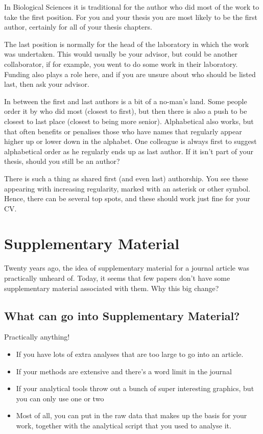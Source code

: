 \documentclass[
]{krantz}
\providecommand{\tightlist}{%
  \setlength{\itemsep}{0pt}\setlength{\parskip}{0pt}}
\begin{document}
In Biological Sciences it is traditional for the author who did most of the work to take the first position. For you and your thesis you are most likely to be the first author, certainly for all of your thesis chapters.

The last position is normally for the head of the laboratory in which the work was undertaken. This would usually be your advisor, but could be another collaborator, if for example, you went to do some work in their laboratory. Funding also plays a role here, and if you are unsure about who should be listed last, then ask your advisor.

In between the first and last authors is a bit of a no-man's land. Some people order it by who did most (closest to first), but then there is also a push to be closest to last place (closest to being more senior). Alphabetical also works, but that often benefits or penalises those who have names that regularly appear higher up or lower down in the alphabet. One colleague is always first to suggest alphabetical order as he regularly ends up as last author. If it isn't part of your thesis, should you still be an author?

There is such a thing as shared first (and even last) authorship. You see these appearing with increasing regularity, marked with an asterisk or other symbol. Hence, there can be several top spots, and these should work just fine for your CV.

\hypertarget{suppinfo}{%
\section{Supplementary Material}\label{suppinfo}}

Twenty years ago, the idea of supplementary material for a journal article was practically unheard of. Today, it seems that few papers don't have some supplementary material associated with them. Why this big change?

\hypertarget{what-can-go-into-supplementary-material}{%
\subsection{What can go into Supplementary Material?}\label{what-can-go-into-supplementary-material}}

Practically anything!

\begin{itemize}
\tightlist
\item
  If you have lots of extra analyses that are too large to go into an article.
\item
  If your methods are extensive and there's a word limit in the journal
\item
  If your analytical tools throw out a bunch of super interesting graphics, but you can only use one or two
\item
  Most of all, you can put in the raw data that makes up the basis for your work, together with the analytical script that you used to analyse it.
\end{itemize}
\end{document}

